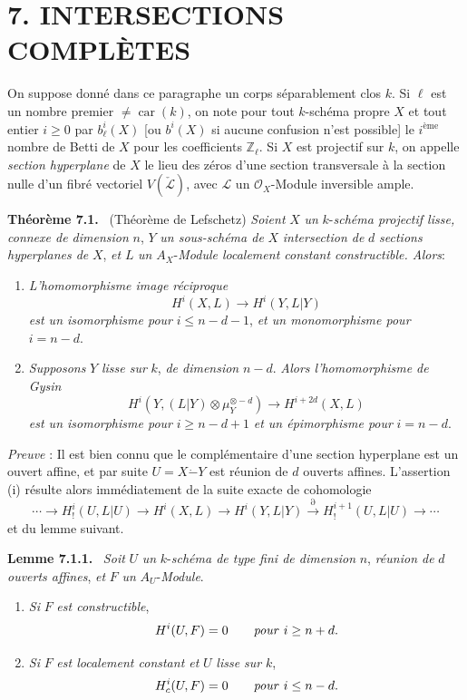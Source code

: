 \documentclass[11pt]{article}
\newenvironment{statement}[1]{\par\medskip\noindent\textbf{#1.}\ }{\par\medskip}
\begin{document}
\section*{7. INTERSECTIONS COMPLÈTES}

On suppose donné dans ce paragraphe un corps séparablement clos $k$. Si $\ell$ est un nombre premier $\ne\operatorname{car}(k)$, on note pour tout $k$-schéma propre $X$ et tout entier $i\ge0$ par
$b_\ell^i(X)$ [ou $b^i(X)$ si aucune confusion n'est possible] le $i^{\text{ème}}$ nombre de Betti de $X$ pour les coefficients $\mathbb Z_\ell$. Si $X$ est projectif sur $k$, on appelle \emph{section hyperplane} de $X$ le lieu des zéros d'une section transversale à la section nulle d'un fibré vectoriel $V(\check{\mathcal L})$, avec $\mathcal L$ un $\mathcal O_X$-Module inversible ample.

\begin{statement}{Théorème 7.1}
(Théorème de Lefschetz) \emph{Soient} $X$ \emph{un} $k$-\emph{schéma projectif lisse, connexe de dimension} $n$, $Y$ \emph{un sous-schéma de} $X$ \emph{intersection de} $d$ \emph{sections hyperplanes de} $X$, \emph{et} $L$ \emph{un} $A_X$-\emph{Module localement constant constructible. Alors}:
\begin{enumerate}[label=(\roman*)]
\item \emph{L'homomorphisme image réciproque}
\[
H^i(X,L)\to H^i(Y,L|Y)
\]
\emph{est un isomorphisme pour} $i\le n-d-1$, \emph{et un monomorphisme pour} $i=n-d$.
\item \emph{Supposons} $Y$ \emph{lisse sur} $k$, \emph{de dimension} $n-d$. \emph{Alors l'homomorphisme de Gysin}
\[
H^i(Y,(L|Y)\otimes\mu_Y^{\otimes -d})\to H^{i+2d}(X,L)
\]
\emph{est un isomorphisme pour} $i\ge n-d+1$ \emph{et un épimorphisme pour} $i=n-d$.
\end{enumerate}
\end{statement}

\emph{Preuve} : Il est bien connu que le complémentaire d'une section hyperplane est un ouvert affine, et par suite $U=X\mathbin{\dot{-}}Y$ est réunion de $d$ ouverts affines. L'assertion (i) résulte alors immédiatement de la suite exacte de cohomologie
\[
\cdots\to H_!^i(U,L|U)\to H^i(X,L)\to H^i(Y,L|Y)
\xrightarrow{\partial} H_!^{i+1}(U,L|U)\to\cdots
\]
et du lemme suivant.

\begin{statement}{Lemme 7.1.1}
\emph{Soit} $U$ \emph{un} $k$-\emph{schéma de type fini de dimension} $n$, \emph{réunion de} $d$ \emph{ouverts affines}, \emph{et} $F$ \emph{un} $A_U$-\emph{Module}.
\begin{enumerate}[label=\alph*)]
\item \emph{Si} $F$ \emph{est constructible},
\[
H^i(U,F)=0\qquad\text{\emph{pour} }i\ge n+d.
\]
\item \emph{Si} $F$ \emph{est localement constant et} $U$ \emph{lisse sur} $k$,
\[
H^i_c(U,F)=0\qquad\text{\emph{pour} }i\le n-d.
\]
\end{enumerate}
\end{statement}
\end{document}
